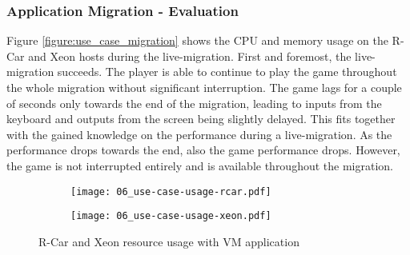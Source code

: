           
        
       
        \subsubsection*{Application Migration - Evaluation}
            
            \noindent Figure \ref{figure:use_case_migration} shows the \ac{CPU} and memory usage on the R-Car and Xeon hosts during the live-migration.
            First and foremost, the live-migration succeeds.
            The player is able to continue to play the game throughout the whole migration without significant interruption.
            The game lags for a couple of seconds only towards the end of the migration, leading to inputs from the keyboard and outputs from the screen being slightly delayed.
            This fits together with the gained knowledge on the performance during a live-migration.
            As the performance drops towards the end, also the game performance drops.
            However, the game is not interrupted entirely and is available throughout the migration.
            
            \begin{figure}[H]
                \centering
                \begin{subfigure}[b]{\textwidth}
                    \centering
                    \texttt{[image: 06\_use-case-usage-rcar.pdf]}
                \end{subfigure}
                \begin{subfigure}[b]{\textwidth}
                    \centering
                    \texttt{[image: 06\_use-case-usage-xeon.pdf]}
                \end{subfigure}
                \caption{R-Car and Xeon resource usage with VM application}
                \label{figure:use_case_usage}
            \end{figure}
            
